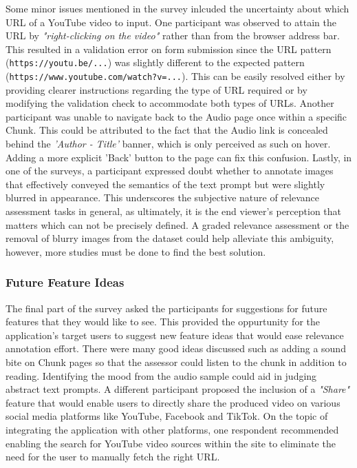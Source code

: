 \documentclass{l4proj}
\begin{document}
Some minor issues mentioned in the survey inlcuded the uncertainty about which URL of a YouTube video to input. One participant was observed to attain the URL by \emph{"right-clicking on the video"} rather than from the browser address bar. This resulted in a validation error on form submission since the URL pattern (\lstinline|https://youtu.be/...|) was slightly different to the expected pattern (\lstinline|https://www.youtube.com/watch?v=...|). This can be easily resolved either by providing clearer instructions regarding the type of URL required or by modifying the validation check to accommodate both types of URLs. Another participant was unable to navigate back to the Audio page once within a specific Chunk. This could be attributed to the fact that the Audio link is concealed behind the \emph{'Author - Title'} banner, which is only perceived as such on hover. Adding a more explicit 'Back' button to the page can fix this confusion. Lastly, in one of the surveys, a participant expressed doubt whether to annotate images that effectively conveyed the semantics of the text prompt but were slightly blurred in appearance. This underscores the subjective nature of relevance assessment tasks in general, as ultimately, it is the end viewer's perception that matters which can not be precisely defined. A graded relevance assessment or the removal of blurry images from the dataset could help alleviate this ambiguity, however, more studies must be done to find the best solution.

\subsubsection{Future Feature Ideas}
The final part of the survey asked the participants for suggestions for future features that they would like to see. This provided the oppurtunity for the application's target users to suggest new feature ideas that would ease relevance annotation effort. There were many good ideas discussed such as adding a sound bite on Chunk pages so that the assessor could listen to the chunk in addition to reading. Identifying the mood from the audio sample could aid in judging abstract text prompts. A different participant proposed the inclusion of a \emph{"Share"} feature that would enable users to directly share the produced video on various social media platforms like YouTube, Facebook and TikTok. On the topic of integrating the application with other platforms, one respondent recommended enabling the search for YouTube video sources within the site to eliminate the need for the user to manually fetch the right URL.
\end{document}
